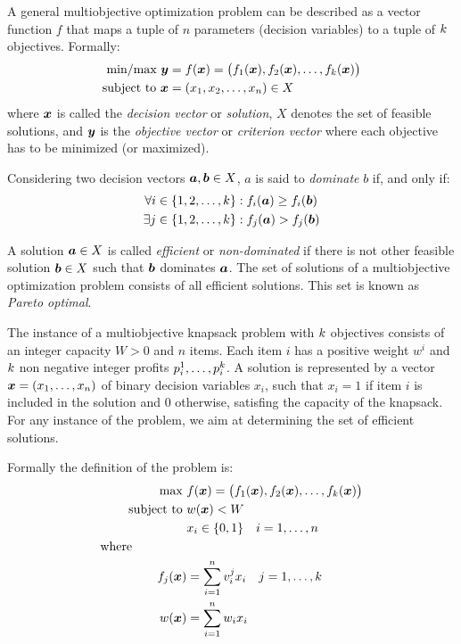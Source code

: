 A general multiobjective optimization problem can be described as a vector
function $f$ that maps a tuple of $n$ parameters (decision variables) to a tuple
of $k$ objectives.
Formally:
\begin{align*}
  \text{min/max} ~ \boldsymbol{y} &= f(\boldsymbol{x}) = 
    \big(f_1(\boldsymbol{x})
    ,f_2(\boldsymbol{x})
    ,\ldots
    ,f_{k}(\boldsymbol{x})\big) \\
  \text{subject to} ~ \boldsymbol{x} & = (x_1, x_2, \ldots, x_n) \in X
\end{align*}
where $\boldsymbol{x}$ is called the \emph{decision vector} or \emph{solution}, $X$ denotes the set
of feasible solutions, and $\boldsymbol{y}$ is the \emph{objective vector} or \emph{criterion vector} where
each objective has to be minimized (or maximized).

Considering two decision vectors $\boldsymbol{a}, \boldsymbol{b} \in X$, $a$ is said to
\emph{dominate} $b$ if, and only if:
\begin{align*}
    \forall i &\in \{1, 2, \ldots, k\}: f_i(\boldsymbol{a}) \geq f_i(\boldsymbol{b}) \\
    \exists j &\in \{1, 2, \ldots, k\}: f_j(\boldsymbol{a}) > f_j(\boldsymbol{b})
\end{align*}

A solution $\boldsymbol{a} \in X$ is called \emph{efficient} or \emph{non-dominated}
if there is not other feasible solution $\boldsymbol{b} \in X$ such that $\boldsymbol{b}$ dominates $\boldsymbol{a}$.
The set of solutions of a multiobjective optimization problem consists of all efficient solutions.
This set is known as \emph{Pareto optimal}.

The instance of a multiobjective knapsack problem with $k$
objectives consists of an integer capacity $W > 0$ and $n$ items.
Each item $i$ has a positive weight $w^i$ and $k$ non negative integer
profits $p_{i}^{1}, \ldots, p_{i}^{k}$.
A solution is represented by a vector $\boldsymbol{x} = (x_1, \ldots, x_n)$ of binary
decision variables $x_i$, such that $x_i = 1$ if item $i$ is included in the
solution and $0$ otherwise, satisfing the capacity of the knapsack.
For any instance of the problem, we aim at determining the set of efficient solutions.

Formally the definition of the problem is:
\begin{align*}
    \text{max   } & f(\boldsymbol{x}) = 
      \big(f_1(\boldsymbol{x}) ,f_2(\boldsymbol{x}) ,\ldots ,f_{k}(\boldsymbol{x})\big) \\
    \text{subject to   } & w(\boldsymbol{x}) < W \\
    & x_{i} \in \{0, 1\} \quad i = 1, \ldots, n \\
    \text{where} \phantom{mmmmm} \\
    f_j(\boldsymbol{x}) &= \sum_{i=1}^{n} v^j_i x_i \quad j = 1, \ldots, k \\
    w(\boldsymbol{x}) &= \sum_{i=1}^{n} w_i x_i
\end{align*}


